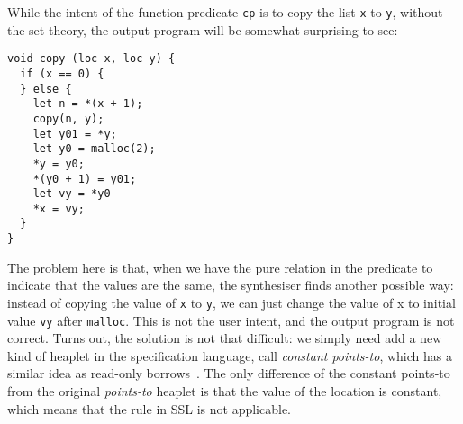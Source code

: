 While the intent of the function predicate \lstinline{cp} is to copy
the list \lstinline{x} to \lstinline{y}, without the set theory, the
output program will be somewhat surprising to see:

\begin{lstlisting}[language=SynLang]
void copy (loc x, loc y) {
  if (x == 0) {
  } else {
    let n = *(x + 1);
    copy(n, y);
    let y01 = *y;
    let y0 = malloc(2);
    *y = y0;
    *(y0 + 1) = y01;
    let vy = *y0
    *x = vy;
  }
}
\end{lstlisting}

The problem here is that, when we have the pure relation in the
predicate to indicate that the values are the same, the synthesiser
finds another possible way: instead of copying the value of
\lstinline{x} to \lstinline{y}, we can just change the value of x to
initial value \lstinline{vy} after \lstinline[language = c]{malloc}.
This is not the user intent, and the output program is not correct.
%
Turns out, the solution is not that difficult: we simply need add a
new kind of heaplet in the specification language, call
\textit{constant points-to}, which has a similar idea as read-only
borrows~\cite{costea2020concise}.
%
%
The only difference of the constant points-to from the original
\textit{points-to} heaplet is that the value of the location is
constant, which means that the \writer rule in SSL is not applicable.



